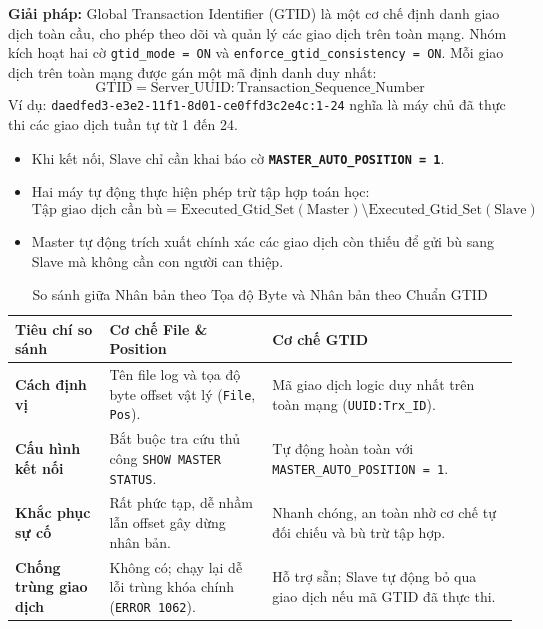 \documentclass[12pt,a4paper]{report}
\begin{document}
\vspace{0.25cm}
\noindent\textbf{Giải pháp:}
Global Transaction Identifier (GTID) là một cơ chế định danh giao dịch toàn cầu, cho phép theo dõi và quản lý các giao dịch trên toàn mạng. Nhóm kích hoạt hai cờ \texttt{gtid\_mode = ON} và \texttt{enforce\_gtid\_consistency = ON}. Mỗi giao dịch trên toàn mạng được gán một mã định danh duy nhất:
$$\text{GTID} = \text{Server\_UUID} : \text{Transaction\_Sequence\_Number}$$
Ví dụ: \texttt{daedfed3-e3e2-11f1-8d01-ce0ffd3c2e4c:1-24} nghĩa là máy chủ đã thực thi các giao dịch tuần tự từ 1 đến 24.
\begin{itemize}
    \item Khi kết nối, Slave chỉ cần khai báo cờ \textbf{\texttt{MASTER\_AUTO\_POSITION = 1}}.
    \item Hai máy tự động thực hiện phép trừ tập hợp toán học:
    $$\text{Tập giao dịch cần bù} = \text{Executed\_Gtid\_Set}(\text{Master}) \setminus \text{Executed\_Gtid\_Set}(\text{Slave})$$
    \item Master tự động trích xuất chính xác các giao dịch còn thiếu để gửi bù sang Slave mà không cần con người can thiệp.
\end{itemize}

\begin{table}[htbp]
\centering
\caption{So sánh giữa Nhân bản theo Tọa độ Byte và Nhân bản theo Chuẩn GTID}
\label{tab:ss_gtid}
\begin{tabularx}{\linewidth}{|>{\raggedright\arraybackslash\bfseries}p{3.5cm}|>{\raggedright\arraybackslash}X|>{\raggedright\arraybackslash}X|}
\hline
\textmd{\textbf{Tiêu chí so sánh}} & \textmd{\textbf{Cơ chế File \& Position}} & \textmd{\textbf{Cơ chế GTID}} \\ \hline
Cách định vị & Tên file log và tọa độ byte offset vật lý (\texttt{File}, \texttt{Pos}). & Mã giao dịch logic duy nhất trên toàn mạng (\texttt{UUID:Trx\_ID}). \\ \hline
Cấu hình kết nối & Bắt buộc tra cứu thủ công \texttt{SHOW MASTER STATUS}. & Tự động hoàn toàn với \texttt{MASTER\_AUTO\_POSITION = 1}. \\ \hline
Khắc phục sự cố & Rất phức tạp, dễ nhầm lẫn offset gây dừng nhân bản. & Nhanh chóng, an toàn nhờ cơ chế tự đối chiếu và bù trừ tập hợp. \\ \hline
Chống trùng giao dịch & Không có; chạy lại dễ lỗi trùng khóa chính (\texttt{ERROR 1062}). & Hỗ trợ sẵn; Slave tự động bỏ qua giao dịch nếu mã GTID đã thực thi. \\ \hline
\end{tabularx}
\end{table}
\end{document}
